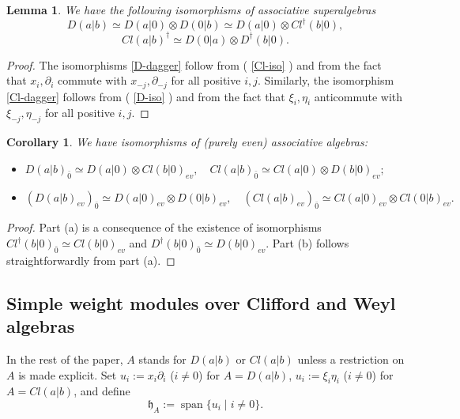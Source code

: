 \documentclass[12pt]{amsart}
\makeatletter
\def\@putname#1#2#3#4{\def\@@ref{#3}\let\old@bf\bf
        \def\bf##1{\old@bf\if?\noexpand##1?{#4}\else##1\fi}%
	#1{#2}%
        \let\bf\old@bf}
\def\@putname#1#2#3#4{\def\@@ref{#3}\let\old@bf\bf	%
	\let\old@reset@font\reset@font			%
        \def\bf##1{\old@bf\if?\noexpand##1?{#4}\else##1\fi}%
	\def\reset@font##1##2{\old@reset@font##1\if?\noexpand##2?{#4}\else##2\fi}#1{#2}%
        \let\bf\old@bf\let\reset@font\old@reset@font}
\let\my@ref=\ref
\def\ref#1{\@putname\my@ref{#1}{#1}{\tiny\rm\@@ref}}
\theoremstyle{plain} %
\numberwithin{equation}{section}
\theoremstyle{definition}
\theoremstyle{remark}
\theoremstyle{plain} %
\newtheorem{lemma}[definition]{Lemma}
\newtheorem{corollary}[definition]{Corollary}
\newcommand{\gh}{\mathfrak{h}}
\def\gh{\mathfrak{h}}
\makeatother
\begin{document}
      \begin{lemma}\label{isomorphism_tensor} We have the following isomorphisms of associative superalgebras
                   \begin{equation}\label{D-dagger}
                   D(a|b)\simeq D(a|0)\otimes D(0|b)\simeq D(a|0)\otimes Cl^\dagger(b|0),
                   \end{equation}
      \begin{equation}\label{Cl-dagger} Cl(a|b)^\dagger\simeq D(0|a)\otimes D^\dagger(b|0).
          \end{equation}
    
      \end{lemma}
      \begin{proof}  The isomorphisms \eqref{D-dagger} follow from (\ref{Cl-iso}) and from the fact that $x_i,\partial_i$ commute with $x_{-j},\partial_{-j}$ for all positive $i,j$. Similarly, the  isomorphism \eqref{Cl-dagger} follows from  (\ref{D-iso}) and from the fact that $\xi_i,\eta_i$ anticommute with $\xi_{-j},\eta_{-j}$ for all positive $i,j$. 
   \end{proof}
   
   \begin{corollary}\label{even-iso} We have isomorphisms of (purely even) associative algebras:
   \begin{itemize}
\item[(a)]
$D(a|b)_{\bar 0}\simeq D(a|0)\otimes Cl(b|0)_{ev},\quad Cl(a|b)_{\bar 0}\simeq Cl(a|0)\otimes D(b|0)_{ev};$
\item[(b)]   $(D(a|b)_{ev})_{\bar 0} \simeq D(a|0)_{ev}\otimes D(0|b)_{ev},\quad (Cl(a|b)_{ev})_{\bar 0}\simeq Cl(a|0)_{ev}\otimes Cl(0|b)_{ev}.$
\end{itemize}
     \end{corollary}
     \begin{proof} Part (a)  is a consequence of the existence of  isomorphisms $Cl^{\dagger}(b|0)_{\bar 0}\simeq Cl(b|0)_{ev}$ and $ D^\dagger(b|0)_{\bar 0}\simeq D(b|0)_{ev}$. Part (b) follows straightforwardly from part (a).
       \end{proof} 

      \subsection{Simple weight modules over Clifford and Weyl algebras} \label{subsec-simple} In the rest of the paper, $A$ stands for $D(a|b)$ or $Cl(a|b)$ unless a restriction on $A$ is made explicit. Set $u_i:=x_i\partial_i$ ($ i  \neq 0$) for $A=D(a|b)$, $u_i:=\xi_i\eta_i$ ($ i  \neq 0$)  for $A=Cl(a|b)$, and define $$\gh_A:=\operatorname{span}\{u_i \mid i \neq 0\}.$$ 
   
\end{document}

